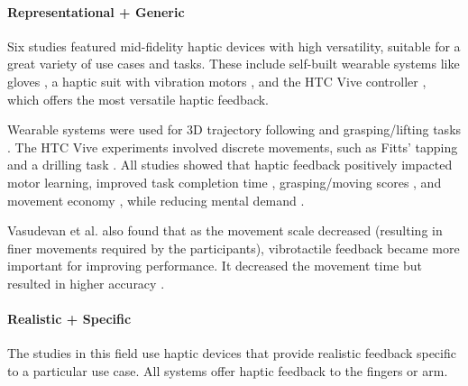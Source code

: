 \paragraph{Representational + Generic} \label{sec:representationalgeneric}

Six studies featured mid-fidelity haptic devices with high versatility, suitable for a great variety of use cases and tasks. These include self-built wearable systems like gloves \cite{LiuH2019, Trinitatova2023}, a haptic suit with vibration motors \cite{Xia2023}, and the HTC Vive controller \cite{Vasudevan2020, Yang2023, McAnally2023}, which offers the most versatile haptic feedback.

Wearable systems were used for 3D trajectory following \cite{Trinitatova2023, Xia2023} and grasping/lifting tasks \cite{LiuH2019}. The HTC Vive experiments involved discrete movements, such as Fitts' tapping \cite{Vasudevan2020, McAnally2023} and a drilling task \cite{Yang2023}. All studies showed that haptic feedback positively impacted motor learning, improved task completion time \cite{Yang2023, McAnally2023}, grasping/moving scores \cite{LiuH2019}, and movement economy \cite{McAnally2023}, while reducing mental demand \cite{Trinitatova2023, Yang2023}. 

Vasudevan et al. also found that as the movement scale decreased (resulting in finer movements required by the participants), vibrotactile feedback became more important for improving performance. It decreased the movement time but resulted in higher accuracy \cite{Vasudevan2020}. 

\paragraph{Realistic + Specific} \label{sec:realisticspecific}

The studies in this field use haptic devices that provide realistic feedback specific to a particular use case. All systems offer haptic feedback to the fingers or arm.

